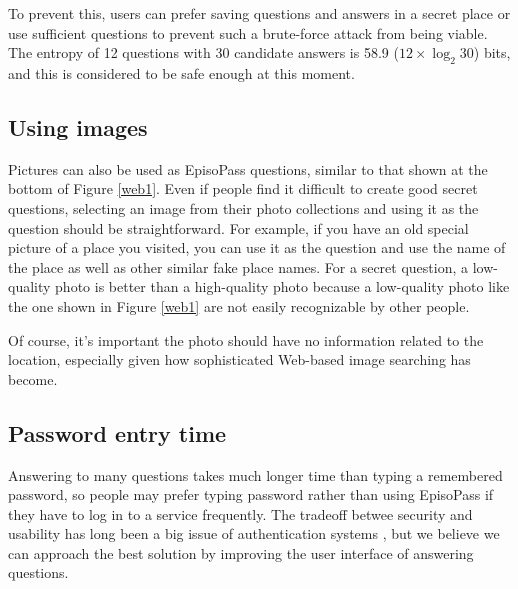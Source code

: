 \documentclass[runningheads,a4paper]{llncs}
\begin{document}
%
To prevent this, users can prefer saving questions and answers in a secret place or
use sufficient questions to prevent such a brute-force attack from being viable.
The entropy of 12 questions with 30 candidate answers 
is 58.9 ($12 \times \log_2 30$) bits, and this is considered to be safe
enough at this moment.

\subsection{Using images}


Pictures can also be used as EpisoPass questions,
similar to that shown at the bottom of Figure \ref{web1}.
Even if people find it difficult to create good secret questions,
selecting an image from their photo collections
and using it as the question should be straightforward.
For example, if you have an old special picture of a place you visited,
you can use it as the question and use the name of the place
as well as other similar fake place names.
For a secret question, a low-quality photo is better than a
high-quality photo because a low-quality photo
like the one shown in Figure \ref{web1} are not
easily recognizable by other people.

Of course, it's important the photo should have no information related
to the location, especially given how sophisticated
Web-based image searching has become.

\subsection{Password entry time}

Answering to many questions takes much longer time than typing a
remembered password, so people may prefer typing password
rather than using EpisoPass if they have to log in to a service frequently.
The tradeoff betwee security and usability has long been a big issue
of authentication systems \cite{Braz:2007:DTU:1778331.1778344},
but we believe we can approach the best solution by
improving the user interface of answering questions.
\end{document}
